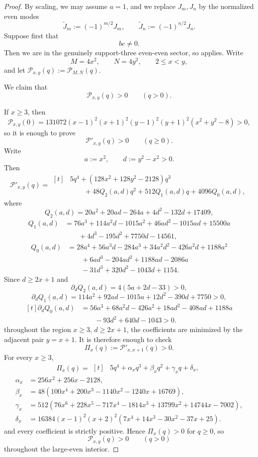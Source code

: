 \documentclass[11pt,reqno]{amsart}
\theoremstyle{definition}
\begin{document}
\begin{proof}
By scaling, we may assume $a=1$, and we replace $J_m,J_n$ by the normalized even modes
\[
\widetilde J_m:=(-1)^{m/2}J_m,
\qquad
\widetilde J_n:=(-1)^{n/2}J_n.
\]
Suppose first that
\[
bc\neq 0.
\]
Then we are in the genuinely support-three even-even sector, so
 applies. Write
\[
M=4x^2,
\qquad
N=4y^2,
\qquad
2\le x<y,
\]
and let $\mathcal P_{x,y}(q):=\mathcal P_{M,N}(q)$.

We claim that
\[
\mathcal P_{x,y}(q)>0
\qquad (q>0).
\]

If $x\ge 3$, then
\[
\mathcal P_{x,y}(0)=131072(x-1)^2(x+1)^2(y-1)^2(y+1)^2(x^2+y^2-8)>0,
\]
so it is enough to prove
\[
\mathcal P'_{x,y}(q)>0
\qquad (q\ge 0).
\]
Write
\[
a:=x^2,
\qquad
d:=y^2-x^2>0.
\]
Then
\[
\mathcal P'_{x,y}(q)
=
\begin{aligned}[t]
&5q^4+(128x^2+128y^2-2128)q^3\\
&\qquad +48Q_2(a,d)q^2+512Q_1(a,d)q+4096Q_0(a,d),
\end{aligned}
\]
where
\[
Q_2(a,d)=20a^2+20ad-264a+4d^2-132d+17409,
\]
\[
\begin{aligned}
Q_1(a,d)
&=76a^3+114a^2d-1015a^2+46ad^2-1015ad+15500a\\
&\qquad +4d^3-195d^2+7750d-14561,
\end{aligned}
\]
\[
\begin{aligned}
Q_0(a,d)
&=28a^4+56a^3d-284a^3+34a^2d^2-426a^2d+1188a^2\\
&\qquad +6ad^3-204ad^2+1188ad-2086a\\
&\qquad -31d^3+320d^2-1043d+1154.
\end{aligned}
\]
Since $d\ge 2x+1$ and
\[
\partial_dQ_2(a,d)=4(5a+2d-33)>0,
\]
\[
\partial_dQ_1(a,d)=114a^2+92ad-1015a+12d^2-390d+7750>0,
\]
\[
\begin{aligned}[t]
\partial_dQ_0(a,d)
&=56a^3+68a^2d-426a^2+18ad^2-408ad+1188a\\
&\qquad -93d^2+640d-1043>0.
\end{aligned}
\]
throughout the region $x\ge 3$, $d\ge 2x+1$, the coefficients are minimized by the adjacent pair
$y=x+1$. It is therefore enough to check
\[
\Pi_x(q):=\mathcal P'_{x,x+1}(q)>0.
\]
For every $x\ge 3$,
\[
\Pi_x(q)
=
\begin{aligned}[t]
&5q^4+\alpha_x q^3+\beta_x q^2+\gamma_x q+\delta_x,
\end{aligned}
\]
\[
\begin{aligned}
\alpha_x&=256x^2+256x-2128,\\
\beta_x&=48(100x^4+200x^3-1140x^2-1240x+16769),\\
\gamma_x&=512(76x^6+228x^5-717x^4-1814x^3+13799x^2+14744x-7002),\\
\delta_x&=16384(x-1)^2(x+2)^2(7x^4+14x^3-30x^2-37x+25).
\end{aligned}
\]
and every coefficient is strictly positive. Hence $\Pi_x(q)>0$ for $q\ge 0$, so
\[
\mathcal P_{x,y}(q)>0
\qquad (q>0)
\]
throughout the large-even interior.


\end{proof}
\end{document}
